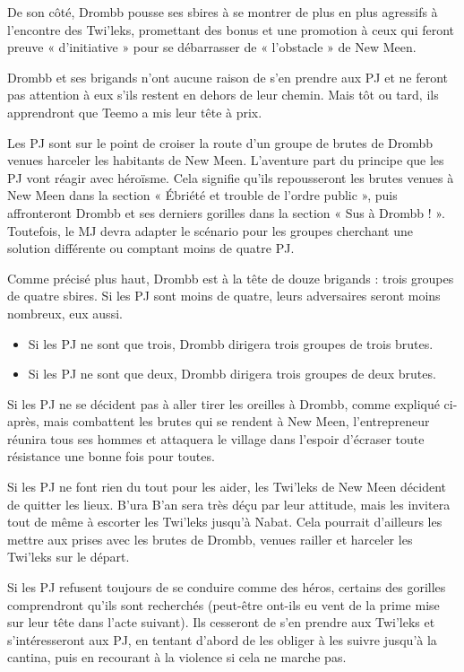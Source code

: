 \documentclass[a4paper,10pt,twoside,twocolumn,openany]{book}
\begin{document}
De son côté, Drombb pousse ses sbires à se montrer
de plus en plus agressifs à l’encontre des Twi’leks, promettant des bonus et une promotion à ceux qui feront
preuve « d’initiative » pour se débarrasser de « l’obstacle » de New Meen.

Drombb et ses brigands n’ont aucune raison de s’en
prendre aux PJ et ne feront pas attention à eux s’ils
restent en dehors de leur chemin. Mais tôt ou tard, ils
apprendront que Teemo a mis leur tête à prix.

\subtitle{ENSUITE…}

Les PJ sont sur le point de croiser la route d’un groupe
de brutes de Drombb venues harceler les habitants de
New Meen. L’aventure part du principe que les PJ vont
réagir avec héroïsme. Cela signifie qu’ils repousseront les
brutes venues à New Meen dans la section « Ébriété et
trouble de l’ordre public », puis affronteront Drombb et
ses derniers gorilles dans la section « Sus à Drombb ! ».
Toutefois, le MJ devra adapter le scénario pour les
groupes cherchant une solution différente ou comptant
moins de quatre PJ.


Comme précisé plus haut, Drombb est à la tête de
douze brigands : trois groupes de quatre sbires. Si les
PJ sont moins de quatre, leurs
adversaires seront moins nombreux, eux aussi.

\begin{itemize}
\item Si les PJ ne sont que trois, Drombb dirigera trois groupes de trois brutes.
\item Si les PJ ne sont que deux, Drombb dirigera trois groupes de deux brutes.
\end{itemize}

Si les PJ ne se décident pas à aller tirer les oreilles à
Drombb, comme expliqué ci-après, mais combattent les
brutes qui se rendent à New Meen, l’entrepreneur réunira tous ses hommes et attaquera le village dans l’espoir
d’écraser toute résistance une bonne fois pour toutes.

Si les PJ ne font rien du tout pour les aider, les Twi’leks
de New Meen décident de quitter les lieux. B’ura B’an
sera très déçu par leur attitude, mais les invitera tout de
même à escorter les Twi’leks jusqu’à Nabat. Cela pourrait
d’ailleurs les mettre aux prises avec les brutes de Drombb,
venues railler et harceler les Twi’leks sur le départ.

Si les PJ refusent toujours de se conduire comme des
héros, certains des gorilles comprendront qu’ils sont
recherchés (peut-être ont-ils eu vent de la prime mise
sur leur tête dans l’acte suivant). Ils cesseront de s’en
prendre aux Twi’leks et s’intéresseront aux PJ, en tentant
d’abord de les obliger à les suivre jusqu’à la cantina, puis
en recourant à la violence si cela ne marche pas.
\end{document}
